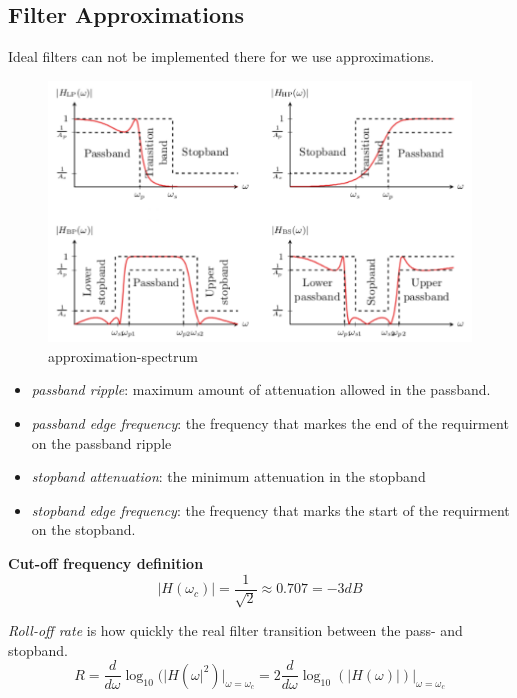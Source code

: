 \documentclass{article}
\begin{document}

\subsection{Filter Approximations}
Ideal filters can not be implemented there for we use approximations. 

\begin{figure}[!h]
    \centering
    \includegraphics[width=12cm]{image/approximation-spectrum.pdf}
    \caption{approximation-spectrum}
    \label{fig:approximation-spectrum}
\end{figure}

\begin{itemize}
    \item \textit{passband ripple}: maximum amount of attenuation allowed in the passband.
    \item \textit{passband edge frequency}: the frequency that markes the end of the requirment on the passband ripple
    \item \textit{stopband attenuation}: the minimum attenuation in the stopband
    \item \textit{stopband edge frequency}: the frequency  that marks the start of the requirment on the stopband.
\end{itemize}

\textbf{Cut-off frequency definition}
\begin{equation*}
   |H(\omega_c)| = \frac{1}{\sqrt{2}} \approx 0.707 = -3dB
\end{equation*}


\textit{Roll-off rate} is how quickly the real filter transition between the pass- and stopband.
\begin{equation*}
    R=\frac{d}{d\omega}\log_10(|H(\omega|^2)\Big|_{\omega=\omega_c} = 2\frac{d}{d\omega}\log_10(|H(\omega)|)\Big|_{\omega=\omega_c}
\end{equation*}
\end{document}

